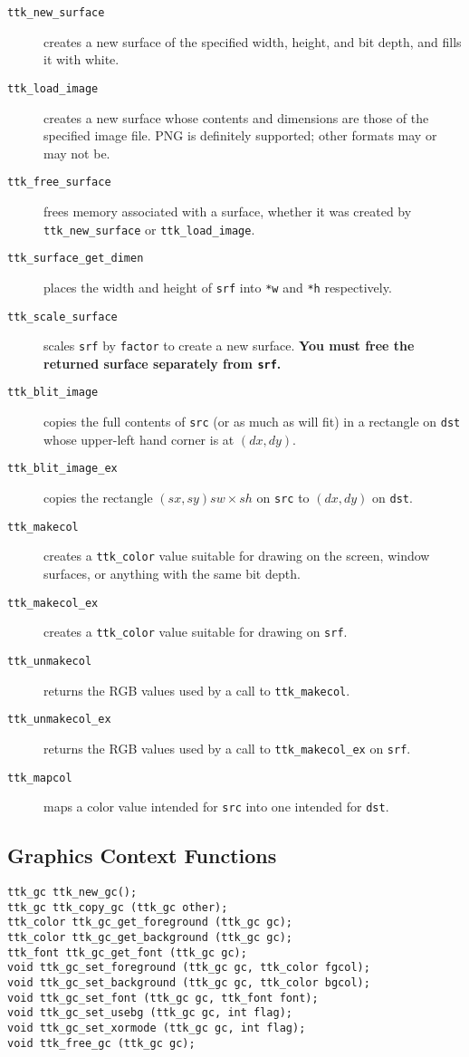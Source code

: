 \documentclass[12pt,letterpaper]{report}
\let\ttt\tt
\def\tt{\def\_{{\ttt\char`\_}}\ttt}
\begin{document}
\begin{description}
\item[{\tt ttk_new_surface}] creates a new surface of the specified width, height, and bit depth, and fills it with white.
\item[{\tt ttk_load_image}] creates a new surface whose contents and dimensions are those of the specified image file.
PNG is definitely supported; other formats may or may not be.
\item[{\tt ttk_free_surface}] frees memory associated with a surface, whether it was created by \verb|ttk_new_surface|
or \verb|ttk_load_image|.
\item[{\tt ttk_surface_get_dimen}] places the width and height of \verb|srf| into \verb|*w| and \verb|*h| respectively.
\item[{\tt ttk_scale_surface}] scales \verb|srf| by \verb|factor| to create a new surface. {\bf You must free the
returned surface separately from \verb|srf|.}
\item[{\tt ttk_blit_image}] copies the full contents of \verb|src| (or as much as will fit) in a rectangle on \verb|dst|
whose upper-left hand corner is at $(dx,dy)$.
\item[{\tt ttk_blit_image_ex}] copies the rectangle $(sx,sy) sw \times sh$ on \verb|src| to $(dx,dy)$ on \verb|dst|.
\item[{\tt ttk_makecol}] creates a \verb|ttk_color| value suitable for drawing on the screen, window surfaces, or
anything with the same bit depth.
\item[{\tt ttk_makecol_ex}] creates a \verb|ttk_color| value suitable for drawing on \verb|srf|.
\item[{\tt ttk_unmakecol}] returns the RGB values used by a call to \verb|ttk_makecol|.
\item[{\tt ttk_unmakecol_ex}] returns the RGB values used by a call to \verb|ttk_makecol_ex| on \verb|srf|.
\item[{\tt ttk_mapcol}] maps a color value intended for \verb|src| into one intended for \verb|dst|.
\end{description}

\subsection{Graphics Context Functions}
\begin{verbatim}
ttk_gc ttk_new_gc();
ttk_gc ttk_copy_gc (ttk_gc other);
ttk_color ttk_gc_get_foreground (ttk_gc gc);
ttk_color ttk_gc_get_background (ttk_gc gc);
ttk_font ttk_gc_get_font (ttk_gc gc);
void ttk_gc_set_foreground (ttk_gc gc, ttk_color fgcol);
void ttk_gc_set_background (ttk_gc gc, ttk_color bgcol);
void ttk_gc_set_font (ttk_gc gc, ttk_font font);
void ttk_gc_set_usebg (ttk_gc gc, int flag);
void ttk_gc_set_xormode (ttk_gc gc, int flag);
void ttk_free_gc (ttk_gc gc);
\end{verbatim}
\end{document}
